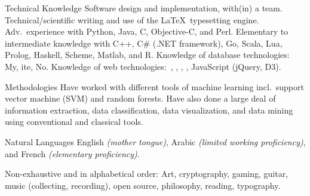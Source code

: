 \documentclass[10pt,a4paper]{article}
\begin{document}


\nocite{Latent2012}
\nocite{DCSI2012}
\nocite{Ref2013}
\nocite{Lisbon2015}
\nocite{Pylogeny}
\nocite{Thesis} %
\printbibliography[heading=none]

\spacedhrule{0.5em}{-0.4em} %



\inlineheadsection
{Technical Knowledge}
{Software design and implementation, with(in) a team. Technical/scientific writing and use of the \LaTeX\ typesetting engine. Adv.\ experience with Python, Java, C, Objective-C, and Perl. Elementary to intermediate knowledge with C++, C\# (.NET framework), Go, Scala, Lua, Prolog, Haskell, Scheme, Matlab, and R. Knowledge of database technologies: My, ite, No. Knowledge of web technologies:\ , , , , JavaScript (jQuery, D3).}

\inlineheadsection 
{Methodologies}
{Have worked with different tools of machine learning incl.\ support vector machine (SVM) and random forests. Have also done a large deal of information extraction, data classification, data visualization, and data mining using conventional and classical tools.}

\inlineheadsection 
{Natural Languages}
{English \textit{(mother tongue)}, Arabic \textit{(limited working proficiency)}, and French \textit{(elementary proficiency)}.}


\spacedhrule{1.6em}{-0.4em} %



\inlineheadsection %
{Non-exhaustive and in alphabetical order:}
{Art, cryptography, gaming, guitar, music (collecting, recording), open source, philosophy, reading, typography.}

\end{document}
